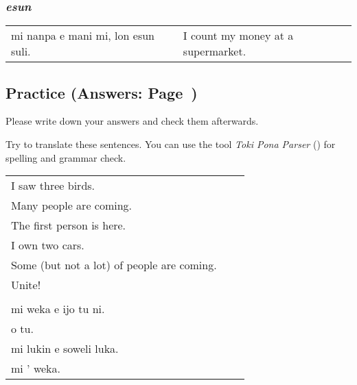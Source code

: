 \subsubsection*{\textit{esun}}

\begin{supertabular}{p{5,5cm}|ll}
mi nanpa e mani mi, lon esun suli. && I count my money at a supermarket. \\
\end{supertabular}
%
\newpage
\subsection*{Practice (Answers: Page~\pageref{'numbers'})}
%
Please write down your answers and check them afterwards. 

Try to translate these sentences. 
You can use the tool \textit{Toki Pona Parser} (\cite{www:rowa:02}) for spelling and grammar check. 

\begin{supertabular}{p{5,5cm}|ll}
I saw three birds.    \\ %
Many people are coming. \\   %
The first person is here. \\   %
I own two cars.   \\ %
Some (but not a lot) of people are coming. \\  %
Unite!    \\ %
 && \\ %
mi weka e ijo tu ni.   \\ %
o tu.   \\ %
mi lukin e soweli luka. \\   %
mi ' weka.   \\ %
\end{supertabular}
